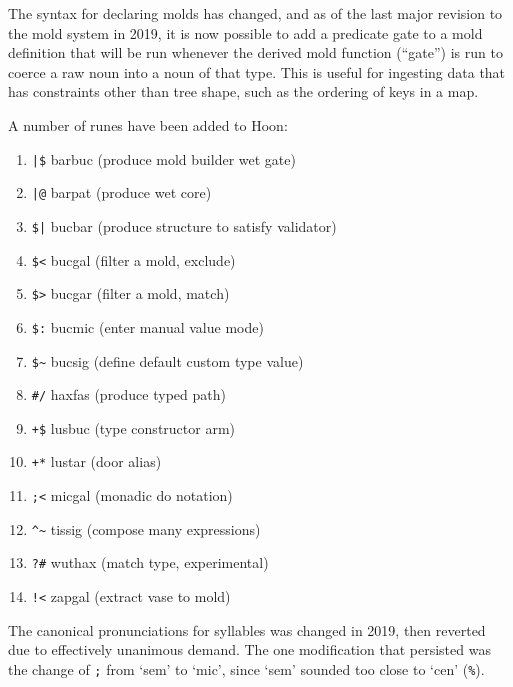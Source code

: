 \documentclass[twoside]{article}
\begin{document}
The syntax for declaring molds has changed, and as of the last major revision to the mold system in 2019, it is now possible to add a predicate gate to a mold definition that will be run whenever the derived mold function (``gate'') is run to coerce a raw noun into a noun of that type.  This is useful for ingesting data that has constraints other than tree shape, such as the ordering of keys in a map.

A number of runes have been added to Hoon:

\begin{enumerate}
  \item  \lstinline[style=inlinecode]{|$} barbuc (produce mold builder wet gate)
  \item  \lstinline[style=inlinecode]{|@} barpat (produce wet core)
  \item  \lstinline[style=inlinecode]{$|} bucbar (produce structure to satisfy validator)
  \item  \lstinline[style=inlinecode]{$<} bucgal (filter a mold, exclude)
  \item  \lstinline[style=inlinecode]{$>} bucgar (filter a mold, match)
  \item  \lstinline[style=inlinecode]{$:} bucmic (enter manual value mode)
  \item  \lstinline[style=inlinecode]{$~} bucsig (define default custom type value)
  \item  \lstinline[style=inlinecode]{#/} haxfas (produce typed path)
  \item  \lstinline[style=inlinecode]{+$} lusbuc (type constructor arm)
  \item  \lstinline[style=inlinecode]{+*} lustar (door alias)
  \item  \lstinline[style=inlinecode]{;<} micgal (monadic do notation)
  \item  \lstinline[style=inlinecode]{^~} tissig (compose many expressions)
  \item  \lstinline[style=inlinecode]{?#} wuthax (match type, experimental)
  \item  \lstinline[style=inlinecode]{!<} zapgal (extract vase to mold)
\end{enumerate}

The canonical pronunciations for syllables was changed in 2019, then reverted due to effectively unanimous demand.  The one modification that persisted was the change of \lstinline[style=inlinecode]{;} from `sem' to `mic', since `sem' sounded too close to `cen' (\lstinline[style=inlinecode]{%}).
\end{document}

